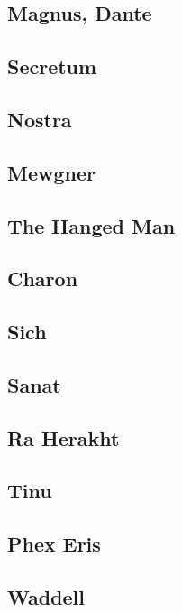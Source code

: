 \begin{multicols}{2}
\subsection{Magnus, Dante} 

\subsection{Secretum}

\subsection{Nostra}

\subsection{Mewgner}

\subsection{The Hanged Man}

\subsection{Charon}

\subsection{Sich}

\subsection{Sanat}

\subsection{Ra Herakht}

\subsection{Tinu}

\subsection{Phex Eris} 

\subsection{Waddell}


\end{multicols}
